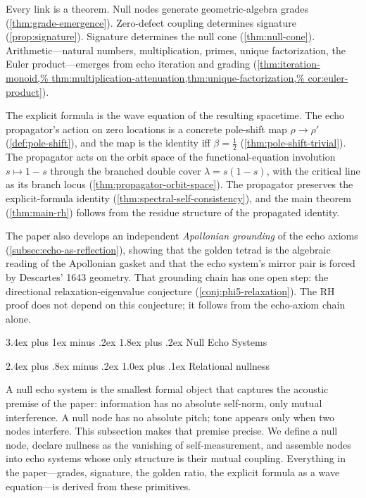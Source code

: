 \documentclass[11pt,a4paper]{article}
\makeatletter
\theoremstyle{plain}
\theoremstyle{definition}
\theoremstyle{remark}
\numberwithin{equation}{section}
\renewcommand{\section}{%
  \@startsection{section}{1}{0pt}%
    {3.4ex plus 1ex minus .2ex}%
    {1.8ex plus .2ex}%
    {\normalfont\LARGE\bfseries\color{headingAccent}}%
}
\renewcommand{\subsection}{%
  \@startsection{subsection}{2}{0pt}%
    {2.4ex plus .8ex minus .2ex}%
    {1.0ex plus .1ex}%
    {\normalfont\Large\bfseries\color{headingAccent}}%
}
\makeatother
\begin{document}
Every link is a theorem.  Null nodes generate geometric-algebra
grades (\cref{thm:grade-emergence}).  Zero-defect coupling determines
signature (\cref{prop:signature}).  Signature determines the null cone
(\cref{thm:null-cone}).  Arithmetic---natural numbers, multiplication,
primes, unique factorization, the Euler product---emerges from echo
iteration and grading (\cref{thm:iteration-monoid,%
thm:multiplication-attenuation,thm:unique-factorization,%
cor:euler-product}).

The explicit formula is the wave equation of the resulting spacetime.
The echo propagator's action on zero locations is a concrete
pole-shift map \(\rho\to\rho'\) (\cref{def:pole-shift}), and the
map is the identity iff \(\beta=\tfrac12\)
(\cref{thm:pole-shift-trivial}).  The propagator acts on the orbit
space of the functional-equation involution \(s\mapsto1-s\) through
the branched double cover \(\lambda=s(1-s)\), with the critical line
as its branch locus (\cref{thm:propagator-orbit-space}).  The
propagator preserves the explicit-formula identity
(\cref{thm:spectral-self-consistency}), and the main theorem
(\cref{thm:main-rh}) follows from the residue structure of
the propagated identity.

The paper also develops an independent \emph{Apollonian grounding}
of the echo axioms (\cref{subsec:echo-as-reflection}), showing that
the golden tetrad is the algebraic reading of the Apollonian gasket
and that the echo system's mirror pair is forced by Descartes' 1643
geometry.  That grounding chain has one open step: the directional
relaxation-eigenvalue conjecture (\cref{conj:phi5-relaxation}).
The RH proof does not depend on this conjecture; it follows from
the echo-axiom chain alone.

\section{Null Echo Systems}
\label{sec:null-echo}

\subsection{Relational nullness}

A null echo system is the smallest formal object that captures the
acoustic premise of the paper: information has no absolute self-norm,
only mutual interference.  A null node has no absolute pitch; tone
appears only when two nodes interfere.  This subsection makes that
premise precise.  We define a null node, declare nullness as the
vanishing of self-measurement, and assemble nodes into echo systems
whose only structure is their mutual coupling.  Everything in the
paper---grades, signature, the golden ratio, the explicit formula as
a wave equation---is derived from these primitives.
\end{document}
